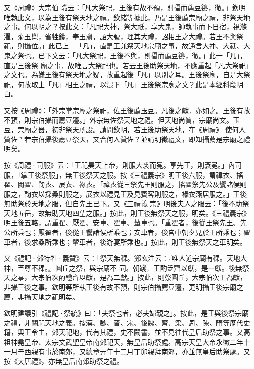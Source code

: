 \begin{pinyinscope}
 又《周禮》大宗伯
 職云：「凡大祭祀，王後有故不預，則攝而薦豆籩，徹。」欽明唯執此文，以為王後有祭天地之禮。欽緒等據此，乃是王後薦宗廟之禮，非祭天地之事。何以明之？按此文：「凡祀大神，祭大祇，享大鬼，帥執事而卜日宿，視滌濯，蒞玉鬯，省牲鑊，奉玉齏，詔大號，理其大禮，詔相王之大禮。若王不與祭祀，則攝位。」此已上一「凡」，直是王兼祭天地宗廟之事，故通言大神、大祇、大鬼之祭也。已下文云：「凡大祭祀，王後不與，則攝而薦豆籩，徹。」此一「凡」，直是王後祭
 廟之事，故唯言大祭祀也。若云王後助祭天地，不應重起「凡大祭祀」之文也。為嫌王後有祭天地之疑，故重起後「凡」以別之耳。王後祭廟，自是大祭祀，何故取上「凡」相王之禮，以混下「凡」王後祭宗廟之文？此是本經科段明白。



 又按《周禮》：「外宗掌宗廟之祭祀，佐王後薦玉豆。凡後之獻，亦如之。王後有故不預，則宗伯攝而薦豆籩。」外宗無佐祭天地之禮。但天地尚質，宗廟尚文。玉豆，宗廟之器，初非祭天所設。請問欽明，若王後助祭天地，在《周禮》
 使何人贊佐？若宗伯攝後薦豆祭天，又合何人贊佐？並請明徵禮文，即知攝薦是宗廟之禮明矣。



 按《周禮·司服》云：「王祀昊天上帝，則服大裘而冕。享先王，則袞冕。」內司服，「掌王後祭服」，無王後祭天之服。按《三禮義宗》明王後六服，謂禕衣、搖翟、闕翟、鞠衣、展衣、褖衣。「禕衣從王祭先王則服之，搖翟祭先公及饗諸侯則服之，鞠衣以採桑則服之，展衣以禮見王及見賓客則服之，褖衣燕居服之。」王後無助祭於天地之服，但自先王已下。又《三禮義
 宗》明後夫人之服云：「後不助祭天地五岳，故無助天地四望之服。」按此，則王後無祭天之服，明矣。《三禮義宗》明王後五輅，謂重翟、厭翟、安車、翟車、輦車也。「重翟者，後從王祭先王、先公所乘也；厭翟者，後從王饗諸侯所乘也；安車者，後宮中朝夕見於王所乘也；翟車者，後求桑所乘也；輦車者，後游宴所乘也。」按此，則王後無祭天之車明矣。



 又《禮記·郊特牲·義贊》云：「祭天無稞。鄭玄注云：『唯人道宗廟有稞。天地大神，至尊不稞。』圓丘之祭，與宗廟不
 同。朝踐，王酌泛齊以獻，是一獻。後無祭天之事，大宗伯次酌醴齊以獻，是為二獻。」按此，則祭圓丘，大宗伯次王為獻，非攝王後之事。欽明等所執王後有故不預，則宗伯攝薦豆籩，更明攝王後宗廟之薦，非攝天地之祀明矣。



 欽明建議引《禮記·祭統》曰：「夫祭也者，必夫婦親之」。按此，是王與後祭宗廟之禮，非關祀天地之義。按漢、魏、晉、宋、後魏、齊、梁、周、陳、隋等歷代史籍，興王令主，郊天祀地，代有其禮，史不闕書，並不見往代皇后助祭之事。又高
 祖神堯皇帝、太宗文武聖皇帝南郊祀天，無皇后助祭處。高宗天皇大帝永徽二年十一月辛西親有事於南郊，又總章元年十二月丁卯親拜南郊，亦並無皇后助祭處。又按《大唐禮》，亦無皇后南郊助祭之禮。




\end{pinyinscope}
